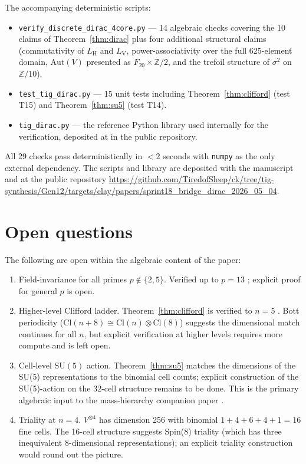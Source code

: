 \documentclass[11pt,reqno]{amsart}
\theoremstyle{plain}
\theoremstyle{definition}
\theoremstyle{remark}
\newcommand{\Z}{\mathbb{Z}}
\newcommand{\Cl}{\mathrm{Cl}}
\newcommand{\Aut}{\mathrm{Aut}}
\DeclareMathOperator{\HARM}{H}
\DeclareMathOperator{\VOID}{V}
\begin{document}
The accompanying deterministic scripts:
\begin{itemize}
\item \texttt{verify\_discrete\_dirac\_4core.py} --- 14 algebraic checks
covering the 10 claims of Theorem~\ref{thm:dirac} plus four additional
structural claims (commutativity of $L_{\HARM}$ and $L_{\VOID}$,
power-associativity over the full 625-element domain, $\Aut(V)$
presented as $F_{20} \times \Z/2$, and the trefoil structure of
$\sigma^2$ on $\Z/10$).
\item \texttt{test\_tig\_dirac.py} --- 15 unit tests including
Theorem~\ref{thm:clifford} (test T15) and Theorem~\ref{thm:su5}
(test T14).
\item \texttt{tig\_dirac.py} --- the reference Python library used
internally for the verification, deposited at
 in the public
repository.
\end{itemize}

All 29 checks pass deterministically in $<2$ seconds with
\texttt{numpy} as the only external dependency. The scripts and
library are deposited with the manuscript and at the public repository
\url{https://github.com/TiredofSleep/ck/tree/tig-synthesis/Gen12/targets/clay/papers/sprint18_bridge_dirac_2026_05_04}.

\section{Open questions}
\label{sec:open}

The following are open within the algebraic content of the paper:

\begin{enumerate}
\item Field-invariance for all primes $p \notin \{2,5\}$. Verified up
to $p = 13$ \cite{SandersGishFpUniversality}; explicit proof for
general $p$ is open.
\item Higher-level Clifford ladder. Theorem~\ref{thm:clifford} is
verified to $n=5$ \cite{SandersGishCliffordLadder}. Bott periodicity
($\Cl(n+8) \cong \Cl(n) \otimes \Cl(8)$) suggests the dimensional
match continues for all $n$, but explicit verification at higher
levels requires more compute and is left open.
\item Cell-level $\mathrm{SU}(5)$ action. Theorem~\ref{thm:su5}
matches the dimensions of the SU(5) representations to the binomial
cell counts; explicit construction of the SU(5)-action on the 32-cell
structure remains to be done. This is the primary algebraic input to
the mass-hierarchy companion paper \cite{SandersJohnsonMassHierarchy}.
\item Triality at $n=4$. $V^{\otimes 4}$ has dimension 256 with
binomial $1+4+6+4+1 = 16$ fine cells. The 16-cell structure suggests
Spin(8) triality (which has three inequivalent 8-dimensional
representations); an explicit triality construction would round out
the picture.
\end{enumerate}
\end{document}
